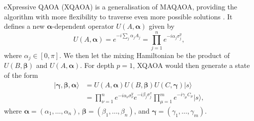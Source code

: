     eXpressive QAOA (XQAOA) is a generalisation of MAQAOA, providing the algorithm with more flexibility to traverse even more possible solutions \cite{vijendran2023expressive}. It defines a new $\pmb{\alpha}$-dependent operator $U(A,\pmb{\alpha})$ given by
    \begin{equation}
        U(A,\pmb{\alpha}) = e^{-i\sum_j\alpha_jA_j} = \prod^n_{j=1}e^{-i\alpha_j\sigma^y_j},
    \end{equation}
    where $\alpha_j\in[0,\pi]$. We then let the mixing Hamiltonian be the product of $U(B,\pmb{\beta})$ and $U(A,\pmb{\alpha})$. For depth $p=1$, XQAOA would then generate a state of the form 
    \begin{align}
        |\pmb{\gamma},\pmb{\beta},\pmb{\alpha}\rangle &= U(A,\pmb{\alpha})U(B,\pmb{\beta})U(C,\pmb{\gamma})|s\rangle \nonumber \\
        &= \prod^n_{\nu=1}e^{-i\alpha_\nu \sigma^y_\nu}e^{-i\beta_j\sigma^x_j}\prod^m_{\mu=1}e^{-i\gamma_\mu C_\mu}|s\rangle,
    \end{align}
    where $\pmb{\alpha}=(\alpha_1,\dots,\alpha_n)$, $\pmb{\beta} = (\beta_1,\dots,\beta_n)$, and $\pmb{\gamma} = (\gamma_1,\dots,\gamma_m)$.

        

        

